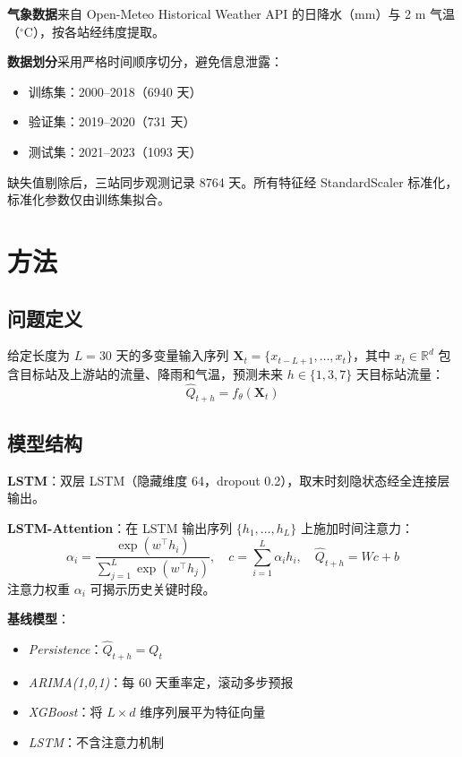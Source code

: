 \documentclass[12pt,a4paper]{article}
\begin{document}
\textbf{气象数据}来自 Open-Meteo Historical Weather API 的日降水（mm）与 2 m 气温（$^\circ$C），按各站经纬度提取。

\textbf{数据划分}采用严格时间顺序切分，避免信息泄露：
\begin{itemize}
  \item 训练集：2000--2018（6940 天）
  \item 验证集：2019--2020（731 天）
  \item 测试集：2021--2023（1093 天）
\end{itemize}

缺失值剔除后，三站同步观测记录 8764 天。所有特征经 StandardScaler 标准化，标准化参数仅由训练集拟合。

\section{方法}

\subsection{问题定义}

给定长度为 $L=30$ 天的多变量输入序列 $\mathbf{X}_t = \{x_{t-L+1}, \ldots, x_t\}$，其中 $x_t \in \mathbb{R}^{d}$ 包含目标站及上游站的流量、降雨和气温，预测未来 $h \in \{1,3,7\}$ 天目标站流量：
\begin{equation}
  \hat{Q}_{t+h} = f_\theta(\mathbf{X}_t)
\end{equation}

\subsection{模型结构}

\textbf{LSTM}：双层 LSTM（隐藏维度 64，dropout 0.2），取末时刻隐状态经全连接层输出。

\textbf{LSTM-Attention}：在 LSTM 输出序列 $\{h_1,\ldots,h_L\}$ 上施加时间注意力：
\begin{equation}
  \alpha_i = \frac{\exp(w^\top h_i)}{\sum_{j=1}^{L}\exp(w^\top h_j)}, \quad
  c = \sum_{i=1}^{L}\alpha_i h_i, \quad \hat{Q}_{t+h} = W c + b
\end{equation}
注意力权重 $\alpha_i$ 可揭示历史关键时段。

\textbf{基线模型}：
\begin{itemize}
  \item \textit{Persistence}：$\hat{Q}_{t+h} = Q_t$
  \item \textit{ARIMA(1,0,1)}：每 60 天重率定，滚动多步预报
  \item \textit{XGBoost}：将 $L \times d$ 维序列展平为特征向量
  \item \textit{LSTM}：不含注意力机制
\end{itemize}
\end{document}
